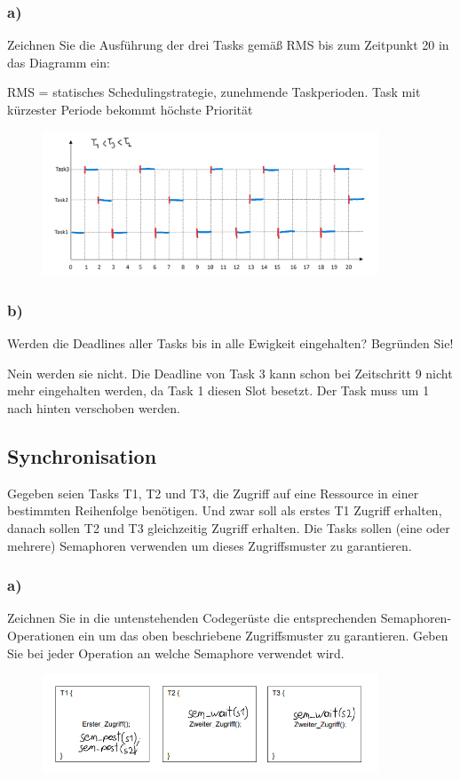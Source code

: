 \subsubsection{a)}
Zeichnen Sie die Ausführung der drei Tasks gemäß RMS bis zum Zeitpunkt 20 in das Diagramm ein:

RMS = statisches Schedulingstrategie, zunehmende Taskperioden. Task mit kürzester Periode bekommt höchste Priorität
\begin{figure}[H]
  \includegraphics[width=10cm]{images/KA020222/2a.PNG}
  \centering
\end{figure}
\subsubsection{b)}
Werden die Deadlines aller Tasks bis in alle Ewigkeit eingehalten? Begründen Sie!

Nein werden sie nicht. Die Deadline von Task 3 kann schon bei Zeitschritt 9 nicht mehr eingehalten werden, da 
Task 1 diesen Slot besetzt. Der Task muss um 1 nach hinten verschoben werden. 

\subsection{Synchronisation}
Gegeben seien Tasks T1, T2 und T3, die Zugriff auf eine Ressource in einer bestimmten Reihenfolge
benötigen. Und zwar soll als erstes T1 Zugriff erhalten, danach sollen T2 und T3 gleichzeitig Zugriff erhalten.
Die Tasks sollen (eine oder mehrere) Semaphoren verwenden um dieses Zugriffsmuster zu garantieren.

\subsubsection{a)}
Zeichnen Sie in die untenstehenden Codegerüste die entsprechenden Semaphoren-Operationen ein
um das oben beschriebene Zugriffsmuster zu garantieren. Geben Sie bei jeder Operation an welche
Semaphore verwendet wird.
\begin{figure}[H]
  \includegraphics[width=10cm]{images/KA020222/4a.PNG}
  \centering
\end{figure}

